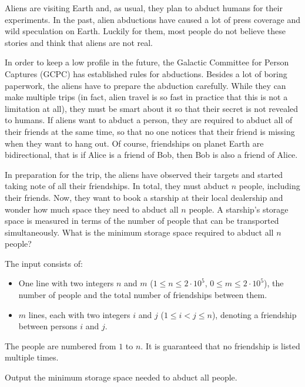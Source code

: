 \newcommand{\maxn}{2 \cdot 10^5}


Aliens are visiting Earth and, as usual, they plan to abduct humans for their experiments.
In the past, alien abductions have caused a lot of press coverage and wild speculation on Earth.
Luckily for them, most people do not believe these stories and think that aliens are not real.

In order to keep a low profile in the future, the Galactic Committee for Person Captures (GCPC) has established rules for abductions.
Besides a lot of boring paperwork, the aliens have to prepare the abduction carefully.
While they can make multiple trips (in fact, alien travel is so fast in practice that this is not a limitation at all),
they must be smart about it so that their secret is not revealed to humans. If aliens want to abduct a person,
they are required to abduct all of their friends at the same time, so that no one notices that their friend is missing when they want to hang out.
Of course, friendships on planet Earth are bidirectional, that is if Alice is a friend of Bob, then Bob is also a friend of Alice.

In preparation for the trip, the aliens have observed their targets and started taking note of all their friendships.
In total, they must abduct $n$ people, including their friends.
Now, they want to book a starship at their local dealership and wonder how much space they need to abduct all $n$ people.
A starship's storage space is measured in terms of the number of people that can be transported simultaneously.
What is the minimum storage space required to abduct all $n$ people?

\begin{Input}
    The input consists of:
    \begin{itemize}
    \item One line with two integers $n$ and $m$ ($1\leq n\leq \maxn$, $0\leq m\leq \maxn$), the number of people and the total number of friendships between them.
    \item $m$ lines, each with two integers $i$ and $j$ ($1\leq i < j\leq n$), denoting a friendship between persons $i$ and $j$.
    \end{itemize}
    The people are numbered from $1$ to $n$. It is guaranteed that no friendship is listed multiple times.
\end{Input}

\begin{Output}
    Output the minimum storage space needed to abduct all people.
\end{Output}
